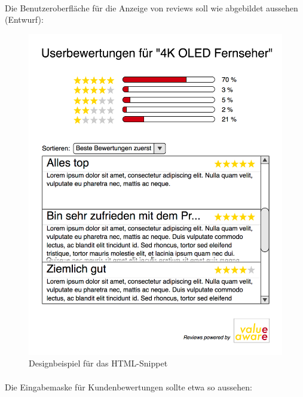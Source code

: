 \documentclass{article}
\begin{document}
\paragraph{}
Die Benutzeroberfläche für die Anzeige von \gls{review}s soll wie abgebildet aussehen (Entwurf):
\begin{figure}[h]
  \centering
  \includegraphics[scale=.35]{review-snippet.png}
  \caption{Designbeispiel für das HTML-Snippet}
  \label{review}
\end{figure}

\pagebreak

\paragraph{}
Die Eingabemaske für Kundenbewertungen sollte etwa so aussehen:
\end{document}
